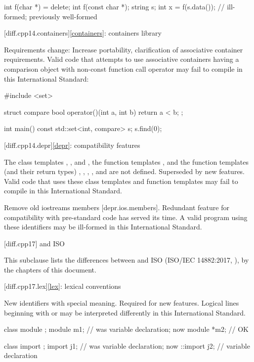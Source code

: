 \begin{codeblock}
int f(char *) = delete;
int f(const char *);
string s;
int x = f(s.data());            // ill-formed; previously well-formed
\end{codeblock}

[diff.cpp14.containers]{\ref{containers}: containers library}

\change
Requirements change:
\rationale
Increase portability, clarification of associative container requirements.
\effect
Valid \CppXIV{} code that attempts to use associative containers
having a comparison object with non-const function call operator
may fail to compile in this International Standard:
\begin{codeblock}
#include <set>

struct compare
{
  bool operator()(int a, int b)
  {
    return a < b;
  }
};

int main() {
  const std::set<int, compare> s;
  s.find(0);
}
\end{codeblock}

[diff.cpp14.depr]{\ref{depr}: compatibility features}

\nodiffref
\change
The class templates
,
, and
,
the function templates
,
and the function templates (and their return types)
,
,
,
, and
are not defined.
\rationale
Superseded by new features.
\effect
Valid \CppXIV{} code that uses these class templates
and function templates may fail to compile in this International Standard.

\nodiffref
\change
Remove old iostreams members [depr.ios.members].
\rationale
Redundant feature for compatibility with pre-standard code
has served its time.
\effect
A valid \CppXIV{} program using these identifiers
may be ill-formed in this International Standard.

[diff.cpp17]{\Cpp{} and ISO \CppXVII{}}

\pnum
{}%
This subclause lists the differences between \Cpp{} and
ISO \CppXVII{} (ISO/IEC 14882:2017, ),
by the chapters of this document.

[diff.cpp17.lex]{\ref{lex}: lexical conventions}

\change
New identifiers with special meaning.
\rationale
Required for new features.
\effect
Logical lines beginning with
 or  may
be interpreted differently
in this International Standard.
\begin{example}
\begin{codeblock}
class module {};
module m1;          // was variable declaration; now 
module *m2;         // OK

class import {};
import j1;          // was variable declaration; now 
::import j2;        // variable declaration
\end{codeblock}
\end{example}

